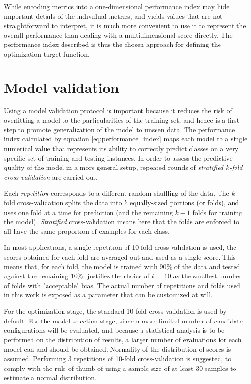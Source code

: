 	While encoding metrics into a one-dimensional performance index may hide important details of
	the individual metrics, and yields values that are not straightforward to interpret, it is much
	more convenient to use it to represent the overall performance than dealing with a
	multidimensional score directly. The performance index described is thus the chosen approach for
	defining the optimization target function.

\section{Model validation}
Using a model validation protocol is important because it reduces the risk of overfitting a model to
the particularities of the training set, and hence is a first step to promote generalization of the
model to unseen data.
The performance index calculated by equation \ref{eq:performance_index} maps each model to a single
numerical value that represents its ability to correctly predict classes on a very specific set of training
and testing instances. In order to assess the predictive quality of the model in a more general
setup, repeated rounds of \emph{stratified $k$-fold cross-validation} are carried out. 

Each \emph{repetition} corresponds to a different random shuffling of the data. The $k$-fold
cross-validation splits the data into $k$ equally-sized portions (or folds), and uses one fold at a
time for prediction (and the remaining $k-1$ folds for training the model). \emph{Stratified} cross-validation
means here that the folds are enforced to all have the same proportion of examples for each class.

In most applications, a single repetition of 10-fold cross-validation is used, the scores obtained
for each fold are averaged out and used as a single score. This means that, for each fold,
the model is trained with 90\% of the data and tested against the remaining 10\%.
\cite{kohavi1995cv} justifies the choice of $k=10$ as the smallest number of folds with "acceptable"
bias. The actual number of repetitions and folds used in this work is exposed as a parameter that
can be customized at will.

For the optimization stage, the standard 10-fold cross-validation is used by default. For the model
selection stage, since a more limited number of candidate configurations will be evaluated, and
because a statistical analysis is to be performed on the distribution of results, a larger number of
evaluations for each model can and should be obtained. Normality of the distribution of scores is assumed.
Performing 3 repetitions of 10-fold cross-validation is suggested, to comply with the rule of thumb
of using a sample size of at least 30 samples to estimate a normal distribution.

